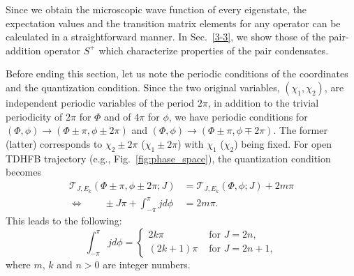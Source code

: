 \documentclass[11pt]{book} %
\begin{document}
Since we obtain the microscopic wave function of every eigenstate,
the expectation values and the transition matrix elements for any operator
can be calculated in a straightforward manner.
In Sec.~\ref{3-3}, we show those of the pair-addition operator
$S^+$ which characterize properties of the pair condensates.

Before ending this section, let us note the periodic conditions
of the coordinates and the quantization condition.
Since the two original variables, $(\chi_1,\chi_2)$,
are independent periodic variables of the period $2\pi$,
in addition to the trivial periodicity of $2\pi$ for $\Phi$ and of $4\pi$
for $\phi$,
we have periodic conditions for
$(\Phi,\phi)\rightarrow (\Phi\pm \pi,\phi\pm 2\pi)$ and
$(\Phi,\phi)\rightarrow (\Phi\pm \pi,\phi\mp 2\pi)$.
The former (latter) corresponds to $\chi_2\pm 2\pi$ ($\chi_1\pm 2\pi$)
with $\chi_1$ ($\chi_2$) being fixed.
For open TDHFB trajectory (e.g., Fig.~\ref{fig:phase_space}),
the quantization condition becomes
\begin{align}
 \mathcal{T}_{J,E_k}(\Phi\pm\pi,\phi\pm 2\pi;J) &= \mathcal{T}_{J,E_k}(\Phi,\phi;J) + 2m\pi \nonumber \\
	 \Leftrightarrow \quad\quad \pm J \pi + \int_{-\pi}^\pi j d\phi
	&= 2m\pi .
\end{align}
This leads to the following:
\begin{equation}
	\int_{-\pi}^\pi j d\phi = 
	\begin{cases}
		2k\pi & \mbox{ for } J=2n ,\\
		(2k+1)\pi & \mbox{ for } J=2n+1 ,
	\end{cases}
	\label{EBK_2}
\end{equation}
where $m$, $k$ and $n>0$ are integer numbers.
\end{document}
